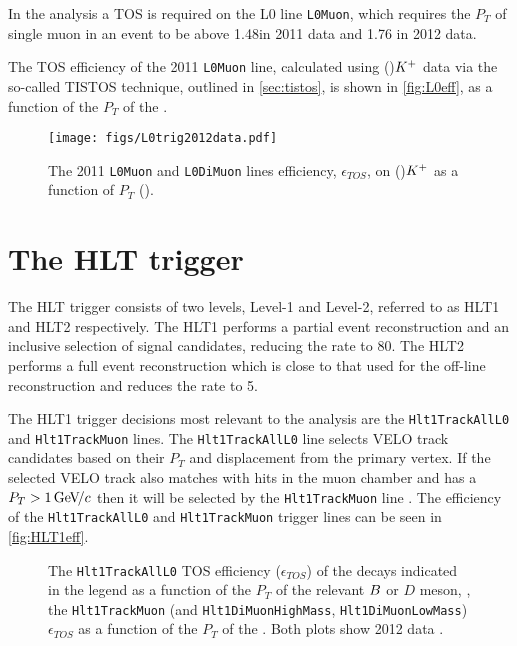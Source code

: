 
In the \Lbpi analysis a TOS is required on the L0 line \texttt{L0Muon}, which requires the $P_{T}$  of single muon in an event to be above 1.48\gevc in 2011 data \cite{2011trig} and 1.76 \gevc in 2012 data.

The TOS efficiency of the 2011 \texttt{L0Muon} line, calculated using \Bu\to\jpsi(\mup\mun)${K}^{+}$ data via the so-called TISTOS technique, outlined in \autoref{sec:tistos}, is shown in \autoref{fig:L0eff}, as a function of the $P_{T}$ of the \jpsi.
\begin{figure}
  \centering
  \texttt{[image: figs/L0trig2012data.pdf]}%
  \caption{The 2011 \texttt{L0Muon} and \texttt{L0DiMuon} lines efficiency, $\epsilon_{TOS}$, on \Bu\to\jpsi(\mup\mun)${K}^{+}$ as a function of $P_{T}$ (\jpsi)\cite{LHCbperf}.
  }
  \label{fig:L0eff}
\end{figure}




\section{The HLT trigger}
\label{sec:hlttrig}
The HLT trigger consists of two levels, Level-1 and Level-2, referred to as HLT1 and HLT2 respectively. The HLT1 performs a partial event reconstruction and an inclusive selection of signal candidates, reducing the rate to 80\khz. The HLT2 performs a full event reconstruction which is close to that used for the off-line reconstruction and reduces the rate to 5\khz.

The HLT1 trigger decisions most relevant to the \Lbpi analysis are the \texttt{Hlt1TrackAllL0} and \texttt{Hlt1TrackMuon} lines. The \texttt{Hlt1TrackAllL0} line selects VELO track candidates based on their $P_{T}$ and displacement from the primary vertex. If the selected VELO track also matches with hits in the muon chamber and has a $P_{T}>1{\mathrm{\,Ge\kern -0.1em V\!/}c}$ then it will be selected by the \texttt{Hlt1TrackMuon} line \cite{trigperf}. The efficiency of the \texttt{Hlt1TrackAllL0} and \texttt{Hlt1TrackMuon} trigger lines can be seen in \autoref{fig:HLT1eff}.%

\begin{figure}
  \centering
    \caption{The \texttt{Hlt1TrackAllL0} TOS efficiency ($\epsilon_{TOS}$) of the decays indicated in the legend as a function of the $P_{T}$ of the relevant ${B}$ or $D$ meson, \protect{}, the \texttt{Hlt1TrackMuon} (and \texttt{Hlt1DiMuonHighMass}, \texttt{Hlt1DiMuonLowMass}) $\epsilon_{TOS}$ as a function of the $P_{T}$ of the \jpsi \protect{}. Both plots show 2012 data \cite{trigperf}.
  }  \label{fig:HLT1eff}
\end{figure}


